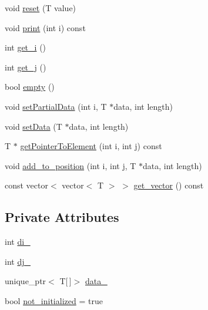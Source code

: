 \begin{DoxyCompactItemize}
void \mbox{\hyperlink{classMatrix2D_a1a646829a2e9d166e0e47439de633b95_a1a646829a2e9d166e0e47439de633b95}{reset}} (T value)
\item 
void \mbox{\hyperlink{classMatrix2D_a27ccf42f23c568b2397b744ec32a41d1_a27ccf42f23c568b2397b744ec32a41d1}{print}} (int i) const
\item 
int \mbox{\hyperlink{classMatrix2D_a9d44e60eef0274c20ed9bd1f597c89eb_a9d44e60eef0274c20ed9bd1f597c89eb}{get\+\_\+i}} ()
\item 
int \mbox{\hyperlink{classMatrix2D_a30918dfce713408a9b3188bea33dbb57_a30918dfce713408a9b3188bea33dbb57}{get\+\_\+j}} ()
\item 
bool \mbox{\hyperlink{classMatrix2D_a5fd8ff857d4554c8fed6ca1ca2f1e87d_a5fd8ff857d4554c8fed6ca1ca2f1e87d}{empty}} ()
\item 
void \mbox{\hyperlink{classMatrix2D_a4c959b3c3807e9ca4d8d62f3e516b933_a4c959b3c3807e9ca4d8d62f3e516b933}{set\+Partial\+Data}} (int i, T $\ast$data, int length)
\item 
void \mbox{\hyperlink{classMatrix2D_a28515c515652637734a22a3440e80258_a28515c515652637734a22a3440e80258}{set\+Data}} (T $\ast$data, int length)
\item 
T $\ast$ \mbox{\hyperlink{classMatrix2D_ac3d6fbe385374e65ce00a34be5a7d323_ac3d6fbe385374e65ce00a34be5a7d323}{get\+Pointer\+To\+Element}} (int i, int j) const
\item 
void \mbox{\hyperlink{classMatrix2D_a2bd34bc1808af36aa3dce5af143ce304_a2bd34bc1808af36aa3dce5af143ce304}{add\+\_\+to\+\_\+position}} (int i, int j, T $\ast$data, int length)
\item 
const vector$<$ vector$<$ T $>$ $>$ \mbox{\hyperlink{classMatrix2D_a2cd319270ca890e47dad636b9af34a11_a2cd319270ca890e47dad636b9af34a11}{get\+\_\+vector}} () const
\end{DoxyCompactItemize}
\subsection*{Private Attributes}
\begin{DoxyCompactItemize}
\item 
int \mbox{\hyperlink{classMatrix2D_ad9c316f4e27753ab30164f90f9dfaee9_ad9c316f4e27753ab30164f90f9dfaee9}{di\+\_\+}}
\item 
int \mbox{\hyperlink{classMatrix2D_a69fb005b681e8740654e28616560a780_a69fb005b681e8740654e28616560a780}{dj\+\_\+}}
\item 
unique\+\_\+ptr$<$ T\mbox{[}$\,$\mbox{]}$>$ \mbox{\hyperlink{classMatrix2D_af6db5a4e311ea727f52f16a7fb15a055_af6db5a4e311ea727f52f16a7fb15a055}{data\+\_\+}}
\item 
bool \mbox{\hyperlink{classMatrix2D_a4138aec11153780128a8d93a3ef06576_a4138aec11153780128a8d93a3ef06576}{not\+\_\+initialized}} = true
\end{DoxyCompactItemize}


